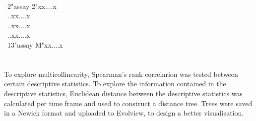 \documentclass[a4paper,12pt]{article}
\begin{document}
\\ \-\ \hspace{0.5cm}2\hspace{1.4cm}"assay 2"\hspace{1.5cm}x\hspace{2cm}x\hspace{1.64cm}....\hspace{1.6cm}x
\\ \-\ \hspace{0.5cm}.\hspace{1.85cm}.\hspace{2.1cm}x\hspace{2cm}x\hspace{1.64cm}....\hspace{1.6cm}x
\\ \-\ \hspace{0.5cm}.\hspace{1.85cm}.\hspace{2.1cm}x\hspace{2cm}x\hspace{1.64cm}....\hspace{1.6cm}x
\\ \-\ \hspace{0.5cm}.\hspace{1.85cm}.\hspace{2.1cm}x\hspace{2cm}x\hspace{1.64cm}....\hspace{1.6cm}x
\\ \-\ \hspace{0.5cm}13\hspace{1.3cm}"assay M"\hspace{1.38cm}x\hspace{2cm}x\hspace{1.64cm}....\hspace{1.6cm}x
\\ \-\ \hspace{0.5cm}\hspace{1.3cm}\hspace{1.38cm}\hspace{2cm}\hspace{1.64cm}\hspace{1.6cm}
\\ \-\ \hspace{0.5cm}\hspace{1.3cm}\hspace{1.38cm}\hspace{2cm}\hspace{1.64cm}\hspace{1.6cm}
\normalsize
\\To explore multicollinearity, Spearman's rank correlarion was tested between certain descriptive statistics. To explore the information contained in the descriptive statistics, Euclidean distance between the descriptive statistics was calculated per time frame and used to construct a distance tree. Trees were saved in a Newick format and uploaded to Evolview\cite{ref37}, to design a better visualisation.
\end{document}
